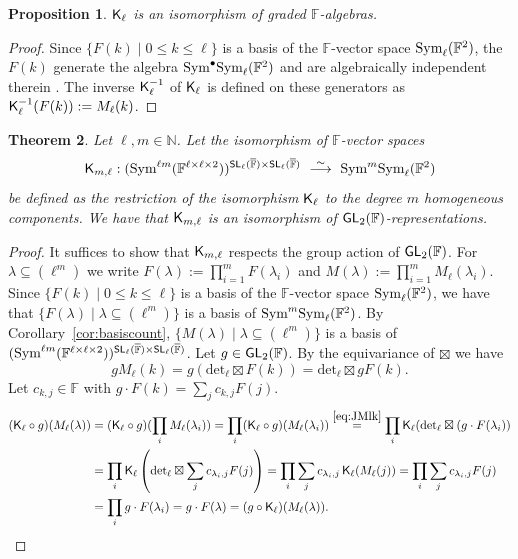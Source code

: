 \documentclass[a4paper]{extarticle}
\newcommand{\IN}{\mathbb{N}}
\newcommand{\IF}{\mathbb{F}}
\newcommand{\oIF}{{\overline{\mathbb{F}}}}
\newcommand{\GL}{\textsf{\textup{GL}}}
\newcommand{\SL}{\textsf{\textup{SL}}}
\newcommand{\Sym}{\textup{Sym}}
\newcommand{\la}{\lambda}
\newcommand{\KP}{\textsf{\textup{K}}}
\renewcommand{\det}{\mathrm{det}}
\newtheorem{theorem}{Theorem}
\numberwithin{theorem}{section}
\newtheorem{proposition}[theorem]{Proposition}
\theoremstyle{definition}
\begin{document}
\begin{proposition}\label{pro:Kliso}
$\KP_{\ell}$ is an isomorphism of graded $\IF$-algebras. \end{proposition}
\begin{proof}
Since $\{F(k)\mid 0\leq k \leq \ell\}$ is a basis of the $\IF$-vector space $\Sym_\ell(\IF^2)$, the $F(k)$ generate the algebra $\Sym^\bullet \Sym_\ell(\IF^2)$ and are algebraically independent therein \cite[Pro.~8.1]{Lan12}.
The inverse $\KP_{\ell}^{-1}$ of $\KP_{\ell}$ is defined on these generators as $\KP_{\ell}^{-1}(F(k)) := M_\ell(k)$.
\end{proof}


\begin{theorem}\label{thm:kpiso}
Let $\ell,m\in \IN$.
Let the isomorphism of $\IF$-vector spaces
\[
\KP_{m,\ell} : (\Sym^{\ell m}(\IF^{\ell\times\ell\times 2}))^{\SL_\ell(\oIF)\times \SL_\ell(\oIF)} \ \stackrel{\sim}{\longrightarrow} \ \Sym^m\Sym_\ell(\IF^2)
\]
be defined as the restriction of the isomorphism $\KP_{\ell}$ to 
the degree $m$ homogeneous components.
We have that $\KP_{m,\ell}$ is an isomorphism of $\GL_2(\IF)$-representations.
\end{theorem}

\begin{proof}
It suffices to show that $\KP_{m,\ell}$ respects the group action of $\GL_2(\IF)$.
For $\la \subseteq (\ell^m)$ we write
$F(\lambda) := \prod_{i=1}^m F(\lambda_i)$ and
$M(\lambda) := \prod_{i=1}^m M_\ell (\lambda_i)$.
Since $\{F(k)\mid 0\leq k\leq \ell\}$ is a basis of the $\IF$-vector space $\Sym_\ell(\IF^2)$, we have that $\{F(\la)\mid \la\subseteq (\ell^m)\}$ is a basis of $\Sym^m\Sym_\ell(\IF^2)$.
By Corollary~\ref{cor:basiscount},
$\{M(\la)\mid \la\subseteq (\ell^m)\}$ is a basis of $(\Sym^{\ell m}(\IF^{\ell\times\ell\times 2}))^{\SL_\ell(\oIF)\times \SL_\ell(\oIF)}$.
Let $g\in \GL_2(\IF)$. By the equivariance of $\boxtimes$ we have
\begin{equation}\label{eq:JMlk}
g M_\ell(k) = g(\det_\ell \boxtimes F(k)) = \det_\ell \boxtimes gF(k).
\end{equation}
Let $c_{k,j} \in \IF$ with $g\cdot F(k) = \sum_{j} c_{k,j} F(j)$.
\begin{align*}
(\KP_{\ell}\circ g) (M_\ell(\la)) &= (\KP_{\ell}\circ g) (\prod_i M_\ell(\la_i)) = \prod_i (\KP_{\ell}\circ g)(M_\ell(\la_i))
\stackrel{\eqref{eq:JMlk}}{=} \prod_i \KP_{\ell}(\det_\ell \boxtimes (g\cdot F(\la_i))
\\
&=
\prod_i \KP_{\ell}\left(\det_\ell \boxtimes\sum_{j} c_{\la_i,j} F(j)\right) =
\prod_i \sum_j c_{\la_i,j} \, \KP_{\ell}(M_\ell(j)) = \prod_i \sum_{j}c_{\la_i,j} F(j)
\\
&=
\prod_i g\cdot F(\la_i)
=
g \cdot F(\lambda) = (g \circ \KP_{\ell})(M_\ell(\lambda)).
\qedhere
\end{align*}
\end{proof}
\end{document}

